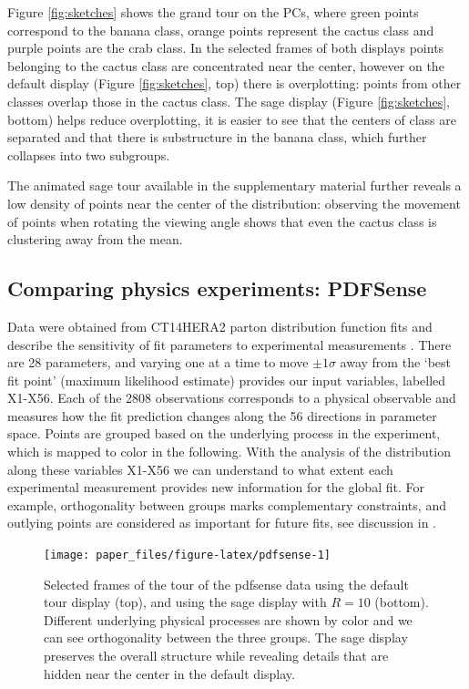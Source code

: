 \documentclass[]{interact}
\theoremstyle{plain}%
\theoremstyle{definition}
\theoremstyle{remark}
\begin{document}
Figure \ref{fig:sketches} shows the grand tour on the PCs, where green
points correspond to the banana class, orange points represent the
cactus class and purple points are the crab class. In the selected
frames of both displays points belonging to the cactus class are
concentrated near the center, however on the default display (Figure
\ref{fig:sketches}, top) there is overplotting: points from other
classes overlap those in the cactus class. The sage display (Figure
\ref{fig:sketches}, bottom) helps reduce overplotting, it is easier to
see that the centers of class are separated and that there is
substructure in the banana class, which further collapses into two
subgroups.

The animated sage tour available in the supplementary material further
reveals a low density of points near the center of the distribution:
observing the movement of points when rotating the viewing angle shows
that even the cactus class is clustering away from the mean.

\hypertarget{sec:appl3}{%
\subsection{Comparing physics experiments: PDFSense}\label{sec:appl3}}

Data were obtained from CT14HERA2 parton distribution function fits and
describe the sensitivity of fit parameters to experimental measurements
\citep{Wang:2018heo}. There are 28 parameters, and varying one at a time
to move \(\pm 1 \sigma\) away from the `best fit point' (maximum
likelihood estimate) provides our input variables, labelled X1-X56. Each
of the 2808 observations corresponds to a physical observable and
measures how the fit prediction changes along the 56 directions in
parameter space. Points are grouped based on the underlying process in
the experiment, which is mapped to color in the following. With the
analysis of the distribution along these variables X1-X56 we can
understand to what extent each experimental measurement provides new
information for the global fit. For example, orthogonality between
groups marks complementary constraints, and outlying points are
considered as important for future fits, see discussion in
\citet{Cook:2018mvr}.

\begin{figure}

{\centering \texttt{[image: paper\_files/figure-latex/pdfsense-1]} 

}

\caption{Selected frames of the tour of the pdfsense data using the default tour display (top), and using the sage display with $R=10$ (bottom). Different underlying physical processes are shown by color and we can see orthogonality between the three groups. The sage display preserves the overall structure while revealing details that are hidden near the center in the default display.}\label{fig:pdfsense}
\end{figure}
\end{document}
